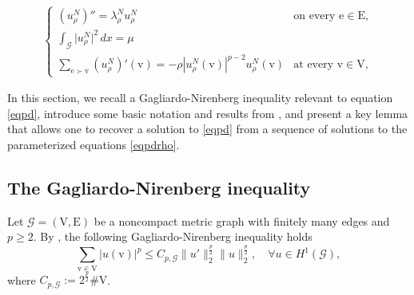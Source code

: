 \documentclass[11pt]{amsart}
\newcommand{\abs}[1]{\lvert#1\rvert}
\newcommand{\norm}[1]{\lVert#1\rVert}
\newcommand{\G}{\mathcal{G}}
\newcommand{\E}{\mathrm{E}}
\newcommand{\V}{\mathrm{V}}
\newcommand{\e}{\mathrm{e}}
\newcommand{\vv}{\mathrm{v}}
\numberwithin{equation}{section}
\begin{document}
\begin{align}\label{Prho}
\begin{cases} 
(u_{\rho}^N)'' = \lambda_{\rho}^N u_{\rho}^N & \text{on every }\e \in \E, \\ 
\int_\G\abs{u_{\rho}^N }^2\, dx = \mu & \\
\displaystyle\sum_{\e \succ \vv} (u_{\rho}^N)' (\vv)= -\rho|u_{\rho}^N(\vv)|^{p-2}u_{\rho}^N(\vv)  & \text{at every } \vv \in \V,
\end{cases}
\end{align}
\fi
 

In this section, we recall a Gagliardo-Nirenberg inequality relevant to equation \eqref{eqpd}, introduce some basic notation and results from \cite{Bort0,Ca}, and present a key lemma that allows one to recover a solution to \eqref{eqpd} from a sequence of solutions to the parameterized equations \eqref{eqpdrho}.
\subsection{The Gagliardo-Nirenberg inequality}
Let  $\G=(\V,\E)$ be a noncompact metric graph with finitely many edges and $p \geq 2$. By \cite[Section 2]{AST2}, the following Gagliardo-Nirenberg inequality holds
\begin{equation}\label{eqgn}
        \sum_{\vv \in \V} \abs{u(\vv)}^p \leq C_{p,\G} \norm{u'}_2^{\frac{p}{2}}\norm{u}_2^{\frac{p}{2}}, \quad \forall u \in H^1(\G),
\end{equation}
where $C_{p,\G}:=2^\frac{p}{2}\#\V$.
\end{document}
